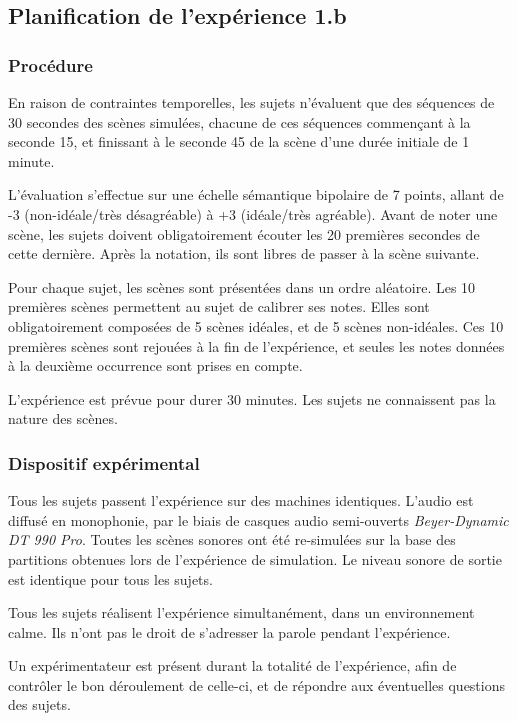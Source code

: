\documentclass[twoside,twocolumn]{article}
\begin{document}
\subsection{Planification  de l'expérience 1.b}
\label{sec:xp1b_plan}

\subsubsection*{Procédure}

En raison de contraintes temporelles, les sujets n'évaluent que des séquences de 30 secondes des scènes simulées, chacune de ces séquences commençant à la seconde 15, et finissant à le seconde 45 de la scène d'une durée initiale de 1 minute.

L'évaluation s'effectue sur une échelle sémantique bipolaire de 7 points, allant de -3 (non-idéale/très désagréable) à +3 (idéale/très agréable). Avant de noter une scène, les sujets doivent obligatoirement écouter les 20 premières secondes de cette dernière. Après la notation, ils sont libres de passer à la scène suivante.

Pour chaque sujet, les scènes sont présentées dans un ordre aléatoire. Les 10 premières scènes permettent au sujet de calibrer ses notes. Elles sont obligatoirement composées de 5 scènes idéales, et de 5 scènes non-idéales. Ces 10 premières scènes sont rejouées à la fin de l'expérience, et seules les notes données à la deuxième occurrence sont prises en compte.

L'expérience est prévue pour durer 30 minutes. Les sujets ne connaissent pas la nature des scènes.

\subsubsection*{Dispositif expérimental}

Tous les sujets passent l'expérience sur des machines identiques. L'audio est diffusé en monophonie, par le biais de casques audio semi-ouverts \emph{Beyer-Dynamic DT 990 Pro}. Toutes les scènes sonores ont été re-simulées sur la base des partitions obtenues lors de l'expérience de simulation. Le niveau sonore de sortie est identique pour tous les sujets.

Tous les sujets réalisent l'expérience simultanément, dans un environnement calme. Ils n'ont pas le droit de s'adresser la parole pendant l'expérience.

Un expérimentateur est présent durant la totalité de l'expérience, afin de contrôler le bon déroulement de celle-ci, et de répondre aux éventuelles questions des sujets.
\end{document}
